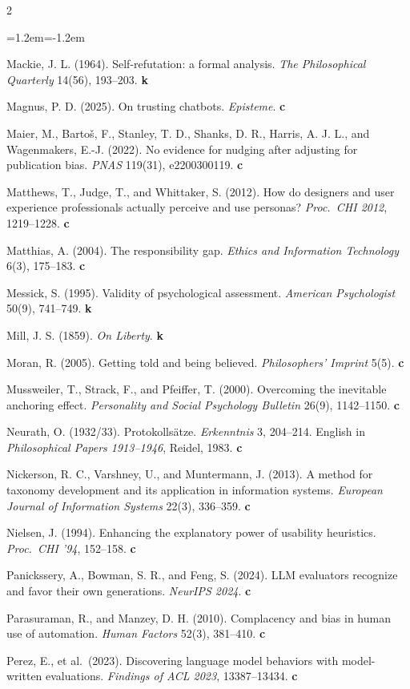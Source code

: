 \documentclass[11pt,a4paper]{article}
\newcounter{art}
\begin{document}
\begin{multicols}{2}
\begin{list}{}{\leftmargin=1.2em\itemindent=-1.2em\itemsep=1pt}
\item Mackie, J. L. (1964). Self-refutation: a formal analysis. \textit{The Philosophical Quarterly} 14(56), 193--203. \textbf{k}
\item Magnus, P. D. (2025). On trusting chatbots. \textit{Episteme}. \textbf{c}
\item Maier, M., Bartoš, F., Stanley, T. D., Shanks, D. R., Harris, A. J. L., and Wagenmakers, E.-J. (2022). No evidence for nudging after adjusting for publication bias. \textit{PNAS} 119(31), e2200300119. \textbf{c}
\item Matthews, T., Judge, T., and Whittaker, S. (2012). How do designers and user experience professionals actually perceive and use personas? \textit{Proc.\ CHI 2012}, 1219--1228. \textbf{c}
\item Matthias, A. (2004). The responsibility gap. \textit{Ethics and Information Technology} 6(3), 175--183. \textbf{c}
\item Messick, S. (1995). Validity of psychological assessment. \textit{American Psychologist} 50(9), 741--749. \textbf{k}
\item Mill, J. S. (1859). \textit{On Liberty}. \textbf{k}
\item Moran, R. (2005). Getting told and being believed. \textit{Philosophers' Imprint} 5(5). \textbf{c}
\item Mussweiler, T., Strack, F., and Pfeiffer, T. (2000). Overcoming the inevitable anchoring effect. \textit{Personality and Social Psychology Bulletin} 26(9), 1142--1150. \textbf{c}
\item Neurath, O. (1932/33). Protokollsätze. \textit{Erkenntnis} 3, 204--214. English in \textit{Philosophical Papers 1913--1946}, Reidel, 1983. \textbf{c}
\item Nickerson, R. C., Varshney, U., and Muntermann, J. (2013). A method for taxonomy development and its application in information systems. \textit{European Journal of Information Systems} 22(3), 336--359. \textbf{c}
\item Nielsen, J. (1994). Enhancing the explanatory power of usability heuristics. \textit{Proc.\ CHI '94}, 152--158. \textbf{c}
\item Panickssery, A., Bowman, S. R., and Feng, S. (2024). LLM evaluators recognize and favor their own generations. \textit{NeurIPS 2024}. \textbf{c}
\item Parasuraman, R., and Manzey, D. H. (2010). Complacency and bias in human use of automation. \textit{Human Factors} 52(3), 381--410. \textbf{c}
\item Perez, E., et al.\ (2023). Discovering language model behaviors with model-written evaluations. \textit{Findings of ACL 2023}, 13387--13434. \textbf{c}

\end{list}
\end{multicols}
\end{document}
